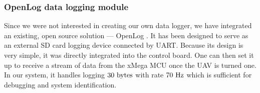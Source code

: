 \subsubsection{OpenLog data logging module}

Since we were not interested in creating our own data logger, we have integrated an existing, open source solution --- OpenLog \citep{openlog}. It has been designed to serve as an external SD card logging device connected by UART. Because its design is very simple, it was directly integrated into the control board. One can then set it up to receive a stream of data from the xMega MCU once the UAV is turned one. In our system, it handles logging $30~\mathrm{bytes}$ with rate $70~\mathrm{Hz}$ which is sufficient for debugging and system identification.

\usetikzlibrary{shapes.geometric,backgrounds,calc}

